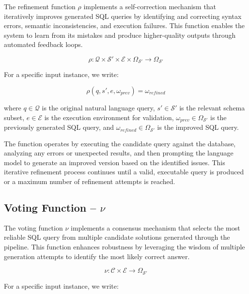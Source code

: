 The refinement function $\rho$ implements a self-correction mechanism that iteratively
improves generated SQL queries by identifying and correcting syntax errors,
semantic inconsistencies, and execution failures. This function enables the system
to learn from its mistakes and produce higher-quality outputs through automated
feedback loops.

$$
\rho: \mathcal{Q} \times \mathcal{S}' \times \mathcal{E} \times \Omega_{\mathcal{S}'} \rightarrow \Omega_{\mathcal{S}'}
$$

\vspace{0.5em}

For a specific input instance, we write:

$$
\rho(q, s', e, \omega_{prev}) = \omega_{refined}
$$

\vspace{0.5em}

where $q \in \mathcal{Q}$ is the original natural language query, $s' \in \mathcal{S}'$
is the relevant schema subset, $e \in \mathcal{E}$ is the execution environment for
validation, $\omega_{prev} \in \Omega_{\mathcal{S}'}$ is the previously generated SQL
query, and $\omega_{refined} \in \Omega_{\mathcal{S}'}$ is the improved SQL query.

The function operates by executing the candidate query against the database, analyzing
any errors or unexpected results, and then prompting the language model to generate
an improved version based on the identified issues. This iterative refinement
process continues until a valid, executable query is produced or a maximum number
of refinement attempts is reached.


\subsection{Voting Function – $\nu$}

The voting function $\nu$ implements a consensus mechanism that selects the most
reliable SQL query from multiple candidate solutions generated through the pipeline.
This function enhances robustness by leveraging the wisdom of multiple generation
attempts to identify the most likely correct answer.

$$
\nu: \mathcal{C} \times \mathcal{E} \rightarrow \Omega_{\mathcal{S}'}
$$

\vspace{0.5em}

For a specific input instance, we write:

